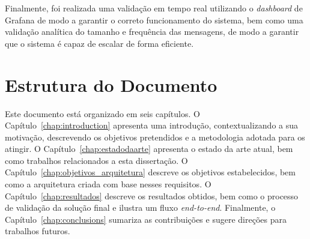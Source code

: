     Finalmente, foi realizada uma validação em tempo real utilizando o \textit{dashboard} de Grafana de modo a garantir o correto funcionamento do sistema, bem como uma validação analítica do tamanho e frequência das mensagens, de modo a garantir que o sistema é capaz de escalar de forma eficiente.
    
    \section{Estrutura do Documento}
    Este documento está organizado em seis capítulos. O Capítulo~\ref{chap:introduction} apresenta uma introdução, contextualizando a sua motivação, descrevendo os objetivos pretendidos e a metodologia adotada para os atingir.
    O Capítulo~\ref{chap:estadodaarte} apresenta o estado da arte atual, bem como trabalhos relacionados a esta dissertação.
    O Capítulo~\ref{chap:objetivos_arquitetura} descreve os objetivos estabelecidos, bem como a arquitetura criada com base nesses requisitos.
    O Capítulo~\ref{chap:resultados} descreve os resultados obtidos, bem como o processo de validação da solução final e ilustra um fluxo \textit{end-to-end}.
    Finalmente, o Capítulo~\ref{chap:conclusions} sumariza as contribuições e sugere direções para trabalhos futuros.



